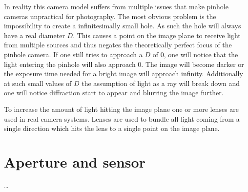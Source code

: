 In reality this camera model suffers from multiple issues that make pinhole cameras unpractical for photography.
The most obvious problem is the impossibility to create a infinitesimally small hole.
As such the hole will always have a real diameter $D$.
This causes a point on the image plane to receive light from multiple sources and thus negates the theoretically perfect focus of the pinhole camera.
If one still tries to approach a $D$ of $0$, one will notice that the light entering the pinhole will also approach $0$.
The image will become darker or the exposure time needed for a bright image will approach infinity.
Additionally at such small values of $D$ the assumption of light as a ray will break down and one will notice diffraction start to appear and blurring the image further.

To increase the amount of light hitting the image plane one or more lenses are used in real camera systems.
Lenses are used to bundle all light coming from a single direction which hits the lens to a single point on the image plane.


\section{Aperture and sensor}


\dots